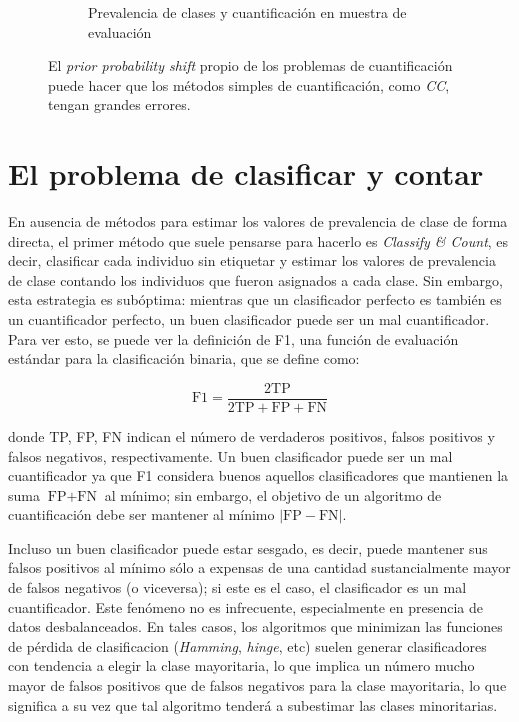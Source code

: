 \begin{figure}[h]
\begin{subfigure}[t]{0.4\textwidth}
        \caption{Prevalencia de clases y cuantificación en muestra de
        evaluación}\label{cambios:cuantificacion_tst}
    \end{subfigure}
    \caption{El {\it prior probability shift\/} propio de los problemas de
    cuantificación puede hacer que los métodos simples de cuantificación, como
    {\it CC}, tengan grandes errores.}
\end{figure}

\section{El problema de clasificar y contar}

En ausencia de métodos para estimar los valores de prevalencia de clase de forma
directa, el primer método que suele pensarse para hacerlo es {\it Classify \&
Count}, es decir, clasificar cada individuo sin etiquetar y estimar los valores
de prevalencia de clase contando los individuos que fueron asignados a cada
clase. Sin embargo, esta estrategia es subóptima: mientras que un clasificador
perfecto es también es un cuantificador perfecto, un buen clasificador puede ser
un mal cuantificador. Para ver esto, se puede ver la definición de F1, una
función de evaluación estándar para la clasificación binaria, que se define
como:

\begin{equation}
    \text{F1} = \frac{2\text{TP}}{2\text{TP}+\text{FP}+\text{FN}}
\end{equation}

donde TP, FP, FN indican el número de verdaderos positivos, falsos positivos y
falsos negativos, respectivamente. Un buen clasificador puede ser un mal
cuantificador ya que F1 considera buenos aquellos clasificadores que mantienen
la suma $\text{FP}+\text{FN}$ al mínimo; sin embargo, el objetivo de un
algoritmo de cuantificación debe ser mantener al mínimo $|\text{FP}-\text{FN}|$.

Incluso un buen clasificador puede estar sesgado, es decir, puede mantener sus
falsos positivos al mínimo sólo a expensas de una cantidad sustancialmente mayor
de falsos negativos (o viceversa); si este es el caso, el clasificador es un mal
cuantificador. Este fenómeno no es infrecuente, especialmente en presencia de
datos desbalanceados. En tales casos, los algoritmos que minimizan las funciones
de pérdida de clasificacion ({\it Hamming}, {\it hinge}, etc) suelen generar
clasificadores con tendencia a elegir la clase mayoritaria, lo que implica un
número mucho mayor de falsos positivos que de falsos negativos para la clase
mayoritaria, lo que significa a su vez que tal algoritmo tenderá a subestimar
las clases minoritarias.


